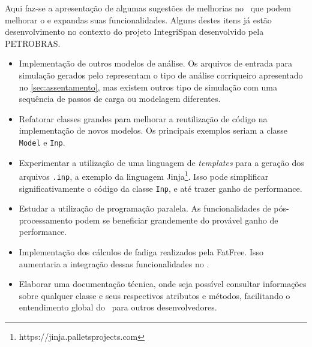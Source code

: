 Aqui faz-se a apresentação de algumas sugestões de melhorias no \frame\ que podem melhorar o e expandas suas funcionalidades. Alguns destes itens já estão desenvolvimento no contexto do projeto IntegriSpan desenvolvido pela PETROBRAS.

\begin{itemize}
    \item Implementação de outros modelos de análise. Os arquivos de entrada para simulação gerados pelo \frame representam o tipo de análise corriqueiro apresentado no \autoref{sec:assentamento}, mas existem outros tipo de simulação com uma sequência de passos de carga ou modelagem diferentes.
    \item Refatorar classes grandes para melhorar a reutilização de código na implementação de novos modelos. Os principais exemplos seriam a classe \texttt{Model} e \texttt{Inp}.
    \item Experimentar a utilização de uma linguagem de \textit{templates} para a geração dos arquivos \texttt{.inp}, a exemplo da linguagem Jinja\footnote{https://jinja.palletsprojects.com}. Isso pode simplificar significativamente o código da classe \texttt{Inp}, e até trazer ganho de performance.
    \item Estudar a utilização de programação paralela. As funcionalidades de pós-processamento podem se beneficiar grandemente do provável ganho de performance.
    \item Implementação dos cálculos de fadiga realizados pela FatFree. Isso aumentaria a integração dessas funcionalidades no \frame.
    \item Elaborar uma documentação técnica, onde seja possível consultar informações sobre qualquer classe e seus respectivos atributos e métodos, facilitando o entendimento global do \frame\ para outros desenvolvedores.
\end{itemize}